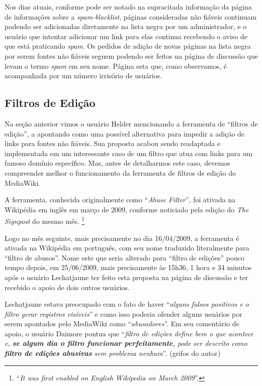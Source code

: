 Nos dias atuais, conforme pode ser notado na supracitada informação da página de informações sobre a \textit{spam-blacklist}, páginas consideradas não fiáveis continuam podendo ser adicionadas diretamente na lista negra por um administrador, e o usuário que intentar adicionar um link para elas continua recebendo o aviso de que está praticando \textit{spam}. Os pedidos de adição de novas páginas na lista negra por serem fontes não fiáveis seguem podendo ser feitos na página de discussão que levam o termo \textit{spam} em seu nome. Página esta que, como observamos, é acompanhada por um número irrisório de usuários.

\subsection{Filtros de Edição}

Na seção anterior vimos o usuário Helder mencionando a ferramenta de ``filtros de edição'', a apontando como uma possível alternativa para impedir a adição de links para fontes não fiáveis. Sua proposta acabou sendo readaptada e implementada em um interessante caso de um filtro que atua com links para um famoso domínio específico. Mas, antes de detalharmos este caso, devemos compreender melhor o funcionamento da ferramenta de filtros de edição do MediaWiki.

A ferramenta, conhecida originalmente como ``\textit{Abuse Filter}'', foi ativada na Wikipédia em inglês em março de 2009, conforme noticiado pela edição do \textit{The Signpost} do mesmo mês.
 \footnote{``\textit{It was first enabled on English Wikipedia on March 2009}''. }

Logo no mês seguinte, mais precisamente no dia 16/04/2009, \cite{extension_abuse_filter} a ferramenta é ativada na Wikipédia em português, com seu nome traduzido literalmente para ``filtro de abusos''. Nome este que seria alterado para ``filtro de edições'' pouco tempo depois, em 25/06/2009, mais precisamente às 15h36,  1 hora e 34 minutos após o usuário Lechatjaune ter feito esta proposta na página de discussão e ter recebido o apoio de dois outros usuários. 

Lechatjaune estava preocupado com o fato de haver ``\textit{alguns falsos positivos e o filtro gerar registros visíveis}'' e como isso poderia ofender alguns usuários por serem apontados pelo MediaWiki como ``\textit{abusadores}''. Em seu comentário de apoio, o usuário Daimore pontua que ``\textit{filtro de edições define bem o que acontece e, \textbf{se algum dia o filtro funcionar perfeitamente}, pode ser descrito como \textbf{filtro de edições abusivas} sem problema nenhum}''. (grifos do autor) 

